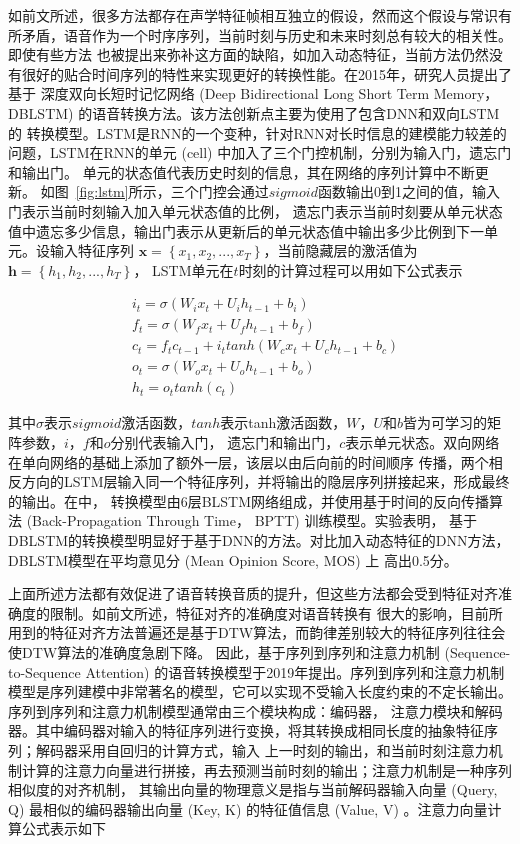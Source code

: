 如前文所述，很多方法都存在声学特征帧相互独立的假设，然而这个假设与常识有所矛盾，语音作为一个时序序列，当前时刻与历史和未来时刻总有较大的相关性。即使有些方法
也被提出来弥补这方面的缺陷，如加入动态特征，当前方法仍然没有很好的贴合时间序列的特性来实现更好的转换性能。在2015年，研究人员提出了基于
深度双向长短时记忆网络 (Deep Bidirectional Long Short Term Memory， DBLSTM) 的语音转换方法\cite{sun2015voice}。该方法创新点主要为使用了包含DNN和双向LSTM的
转换模型。LSTM是RNN的一个变种，针对RNN对长时信息的建模能力较差的问题，LSTM在RNN的单元 (cell) 中加入了三个门控机制，分别为输入门，遗忘门和输出门。
单元的状态值代表历史时刻的信息，其在网络的序列计算中不断更新。
如图~\ref{fig:lstm}所示，三个门控会通过$sigmoid$函数输出0到1之间的值，输入门表示当前时刻输入加入单元状态值的比例，
遗忘门表示当前时刻要从单元状态值中遗忘多少信息，输出门表示从更新后的单元状态值中输出多少比例到下一单元。设输入特征序列
$\mathbf{x}=\left\{x_1,x_2,...,x_T\right\}$，当前隐藏层的激活值为$\mathbf{h}=\left\{h_1,h_2,...,h_T\right\}$，
LSTM单元在$t$时刻的计算过程可以用如下公式表示

\begin{align}
    & i_t = \sigma (W_{i}x_t + U_ih_{t-1}+b_i) \\
    & f_t = \sigma (W_{f}x_t + U_fh_{t-1}+b_f) \\
    & c_t = f_tc_{t-1} + i_ttanh(W_cx_t+U_ch_{t-1}+b_c) \\
    & o_t = \sigma (W_{o}x_t + U_oh_{t-1}+b_o) \\
    & h_t = o_ttanh(c_t)
\end{align}
  
其中$\sigma$表示$sigmoid$激活函数，$tanh$表示tanh激活函数，$W$，$U$和$b$皆为可学习的矩阵参数，$i$，$f$和$o$分别代表输入门，
遗忘门和输出门，$c$表示单元状态。双向网络在单向网络的基础上添加了额外一层，该层以由后向前的时间顺序
传播，两个相反方向的LSTM层输入同一个特征序列，并将输出的隐层序列拼接起来，形成最终的输出。在\cite{sun2015voice}中，
转换模型由6层BLSTM网络组成，并使用基于时间的反向传播算法 (Back-Propagation Through Time， BPTT) 训练模型。实验表明，
基于DBLSTM的转换模型明显好于基于DNN的方法。对比加入动态特征的DNN方法，DBLSTM模型在平均意见分 (Mean Opinion Score, MOS) 上
高出0.5分。

上面所述方法都有效促进了语音转换音质的提升，但这些方法都会受到特征对齐准确度的限制。如前文所述，特征对齐的准确度对语音转换有
很大的影响，目前所用到的特征对齐方法普遍还是基于DTW算法，而韵律差别较大的特征序列往往会使DTW算法的准确度急剧下降。
因此，基于序列到序列和注意力机制 (Sequence-to-Sequence Attention) 的语音转换模型于2019年提出\cite{tanaka2019atts2s}。序列到序列和注意力机制
模型是序列建模中非常著名的模型，它可以实现不受输入长度约束的不定长输出。序列到序列和注意力机制模型通常由三个模块构成：编码器，
注意力模块和解码器。其中编码器对输入的特征序列进行变换，将其转换成相同长度的抽象特征序列；解码器采用自回归的计算方式，输入
上一时刻的输出，和当前时刻注意力机制计算的注意力向量进行拼接，再去预测当前时刻的输出；注意力机制是一种序列相似度的对齐机制，
其输出向量的物理意义是指与当前解码器输入向量 (Query, Q) 最相似的编码器输出向量 (Key, K) 的特征值信息 (Value, V) 。注意力向量计算公式表示如下


